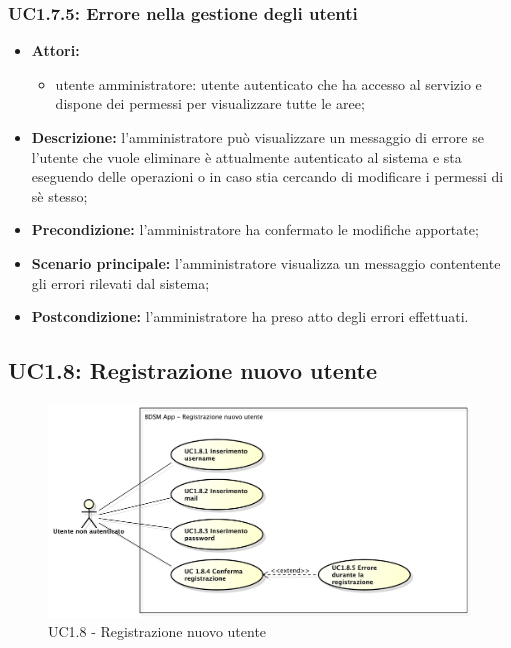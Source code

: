 \subsubsection{UC1.7.5: Errore nella gestione degli utenti}
\begin{itemize}
	\item \textbf{Attori:}
	\begin{itemize}
		\item utente amministratore: utente autenticato che ha accesso al servizio e dispone dei permessi per visualizzare tutte le aree;
	\end{itemize}
	\item \textbf{Descrizione:} l’amministratore può visualizzare un messaggio di errore se l’utente che vuole eliminare è attualmente autenticato al sistema e sta eseguendo delle operazioni o in caso stia cercando di modificare i permessi di sè stesso;
	\item \textbf{Precondizione:} l'amministratore ha confermato le modifiche apportate;
	\item \textbf{Scenario principale:} l'amministratore visualizza un messaggio contentente gli errori rilevati dal sistema;
	\item \textbf{Postcondizione:} l'amministratore ha preso atto degli errori effettuati.
\end{itemize}

\pagebreak


\subsection{UC1.8: Registrazione nuovo utente}
\begin{figure}[!htbp]
	\centering
	\centerline{\includegraphics[scale=0.45]{./images/UC1_8.pdf}}
	\caption{UC1.8 - Registrazione nuovo utente}
\end{figure}

